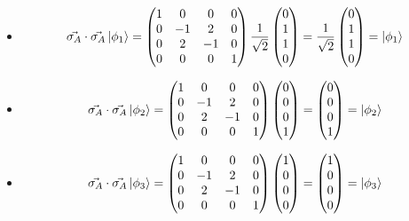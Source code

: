 \documentclass[12pt]{article}
\begin{document}
\begin{itemize}
\item $$
        \vec{\sigma_A}\cdot\vec{\sigma_A}\ket{\phi_1} = \begin{pmatrix*}
            1 &0& 0& 0\\
            0 &-1 &2& 0 \\ 
            0 &2& -1 &0 \\ 
            0 &0 &0 &1
        \end{pmatrix*} \frac{1}{\sqrt{2}}\begin{pmatrix*}
            0\\1\\1\\0
        \end{pmatrix*} = \frac{1}{\sqrt{2}}\begin{pmatrix*}
            0\\1\\1\\0
        \end{pmatrix*} = \ket{\phi_1}
        $$
\item  $$
        \vec{\sigma_A}\cdot\vec{\sigma_A}\ket{\phi_2} = \begin{pmatrix*}
            1 &0& 0& 0\\
            0 &-1 &2& 0 \\ 
            0 &2& -1 &0 \\ 
            0 &0 &0 &1
        \end{pmatrix*} \begin{pmatrix*}
            0\\0\\0\\1
        \end{pmatrix*} =\begin{pmatrix*}
            0\\0\\0\\1
        \end{pmatrix*} = \ket{\phi_2}
        $$
 \item  $$
        \vec{\sigma_A}\cdot\vec{\sigma_A}\ket{\phi_3} = \begin{pmatrix*}
            1 &0& 0& 0\\
            0 &-1 &2& 0 \\ 
            0 &2& -1 &0 \\ 
            0 &0 &0 &1
        \end{pmatrix*} \begin{pmatrix*}
            1\\0\\0\\0
        \end{pmatrix*} =\begin{pmatrix*}
            1\\0\\0\\0
        \end{pmatrix*} = \ket{\phi_3}
        $$


\end{itemize}
\end{document}
